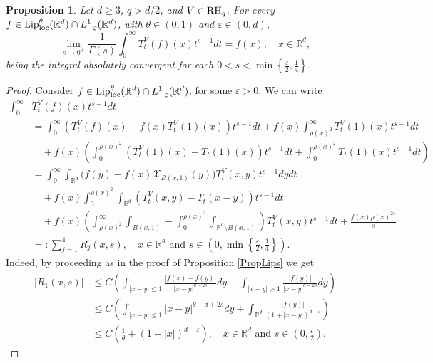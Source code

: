 \documentclass[10pt, a4paper, reqno]{amsart}
\newtheorem{prop}[thm]{Proposition}
\theoremstyle{definition}
\theoremstyle{remark}
\numberwithin{equation}{section}
\begin{document}
\begin{prop}\label{PropLip-s}
Let $d\geq 3$, $q>d/2$, and $V\in {\rm RH}_q$. For every $f\in {\textup{Lip}}_\textup{loc}^\theta (\mathbb R^d)\cap L^1_{-\varepsilon}(\mathbb R^d)$, with $\theta \in (0,1)$ and $\varepsilon \in (0,d)$, 
\begin{equation}\label{limLip}
\lim_{s\rightarrow 0^+}\frac{1}{\Gamma (s)}\int_0^\infty T_t^V(f)(x)t^{s-1}dt=f(x),\quad x\in \mathbb R^d,
\end{equation}
being the integral absolutely convergent for each $0<s<\min\left\{\tfrac{\varepsilon}{2}, \tfrac14\right\}$. 
\end{prop}
\begin{proof}
Consider $f\in {\textup{Lip}}^\theta _{\rm loc}(\mathbb R^d)\cap L^1_{-\varepsilon}(\mathbb R^d)$, for some $\varepsilon >0$. We can write
\begin{align}\label{sumR}
\int_0^\infty &T_t^V(f)(x)t^{s-1}dt\nonumber\\
   &=\int_0^\infty(T_t^V(f)(x)-f(x)T_t^V(1)(x))t^{s-1}dt+f(x)\int_{\rho (x)^2}^\infty T_t^V(1)(x)t^{s-1}dt\nonumber\\
    &\quad +f(x)\left(\int_0^{\rho (x)^2} (T_t^V(1)(x)-T_t(1)(x))t^{s-1}dt+\int_0^{\rho (x)^2}T_t(1)(x)t^{s-1}dt\right)\nonumber\\
     &=\int_0^\infty\int_{\mathbb R^d}\big(f(y)-f(x)\mathcal X_{B(x,1)}(y)\big)T_t^V(x,y)t^{s-1}dydt\nonumber\\
      &\quad +f(x)\int_0^{\rho (x)^2} \int_{\mathbb R^d}(T_t^V(x,y)-T_t(x-y))t^{s-1}dt\nonumber\\
      &\quad +f(x)\left(\int_{\rho (x)^2}^\infty\int_{B(x,1)}-\int_0^{\rho (x)^2}\int_{\mathbb R^d\setminus B(x,1)}\right)T_t^V(x,y)t^{s-1}dt+\frac{f(x)\rho (x)^{2s}}{s}\nonumber\\   
    &=:\sum_{j=1}^4R_j(x,s),\quad x\in \mathbb R^d\mbox{ and }s\in (0,\min\left\{\tfrac{\varepsilon }{2},\tfrac{1}{4}\right\}).
\end{align}
Indeed, by proceeding as in the proof of Proposition \ref{PropLips} we get 
\begin{align*}
|R_1(x,s)|&\leq C\left(\int_{|x-y|\leq 1}\frac{|f(x)-f(y)|}{|x-y|^{d-2s}}dy+\int_{|x-y|>1}\frac{|f(y)|}{|x-y|^{d-2s}}dy\right)\\
&\leq C\left(\int_{|x-y|\leq 1}|x-y|^{\theta -d+2s}dy+\int_{\mathbb R^d}\frac{|f(y)|}{(1+|x-y|)^{d-\varepsilon}}\right)\\
&\leq C\left(\frac{1}{\theta }+(1+|x|)^{d-\varepsilon}\right),\quad x\in \mathbb R^d\mbox{ and }s\in \left(0,\tfrac{\varepsilon}{2}\right).

\end{align*}
\end{proof}
\end{document}
